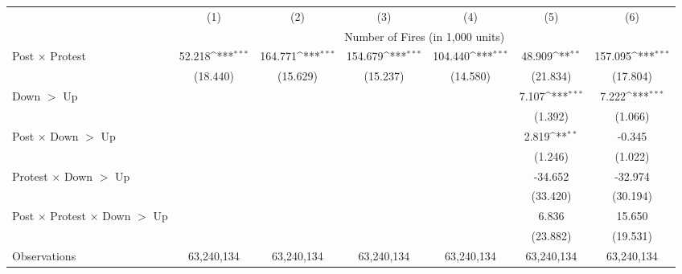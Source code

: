 {
\def\sym#1{\ifmmode^{#1}\else\(^{#1}\)\fi}
\begin{tabular}{l*{6}{c}}
\hline
            &\multicolumn{1}{c}{(1)}         &\multicolumn{1}{c}{(2)}         &\multicolumn{1}{c}{(3)}         &\multicolumn{1}{c}{(4)}         &\multicolumn{1}{c}{(5)}         &\multicolumn{1}{c}{(6)}         \\
            & \multicolumn{6}{c}{Number of Fires (in 1,000 units)} \\ \hline

Post $\times$ Protest&      52.218\sym{***}&     164.771\sym{***}&     154.679\sym{***}&     104.440\sym{***}&      48.909\sym{**} &     157.095\sym{***}\\
            &    (18.440)         &    (15.629)         &    (15.237)         &    (14.580)         &    (21.834)         &    (17.804)         \\
Down $>$ Up &                     &                     &                     &                     &       7.107\sym{***}&       7.222\sym{***}\\
            &                     &                     &                     &                     &     (1.392)         &     (1.066)         \\
Post $\times$ Down $>$ Up&                     &                     &                     &                     &       2.819\sym{**} &      -0.345         \\
            &                     &                     &                     &                     &     (1.246)         &     (1.022)         \\
Protest $\times$ Down $>$ Up&                     &                     &                     &                     &     -34.652         &     -32.974         \\
            &                     &                     &                     &                     &    (33.420)         &    (30.194)         \\
Post $\times$ Protest $\times$ Down $>$ Up&                     &                     &                     &                     &       6.836         &      15.650         \\
            &                     &                     &                     &                     &    (23.882)         &    (19.531)         \\
\hline
Observations&  63,240,134         &  63,240,134         &  63,240,134         &  63,240,134         &  63,240,134         &  63,240,134         \\

\end{tabular}}
